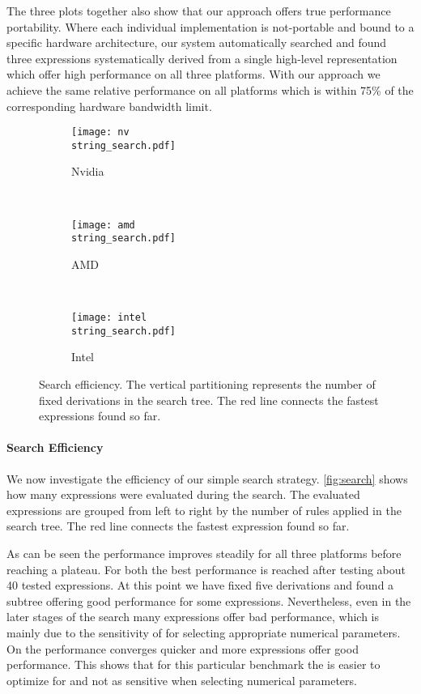 The three plots together also show that our approach offers true performance portability.
Where each individual \BLAS implementation is not-portable and bound to a specific hardware architecture, our system automatically searched and found three expressions systematically derived from a single high-level representation which offer high performance on all three platforms.
With our approach we achieve the same relative performance on all platforms which is within 75\% of the corresponding hardware bandwidth limit.

\begin{figure*}[p]
%
\centering
\begin{subfigure}[b]{0.65\linewidth}
\texttt{[image: nv\\string\_search.pdf]}
\caption{Nvidia \GPU}
\label{fig:search:nv}
\end{subfigure}
\\
%
\begin{subfigure}[b]{0.65\linewidth}
\texttt{[image: amd\\string\_search.pdf]}
\caption{AMD \GPU}
\label{fig:search:amd}
\end{subfigure}
\\
%
\begin{subfigure}[b]{0.65\linewidth}
\texttt{[image: intel\\string\_search.pdf]}
\caption{Intel \CPU}
\label{fig:search:intel}
\end{subfigure}

\caption[Search efficiency of our prototype search tool]{
   Search efficiency.
   The vertical partitioning represents the number of fixed derivations in the search tree.
   The red line connects the fastest expressions found so far.
}
\label{fig:search}
\end{figure*}


\paragraph{Search Efficiency}
We now investigate the efficiency of our simple search strategy.
\autoref{fig:search} shows how many expressions were evaluated during the search.
The evaluated expressions are grouped from left to right by the number of rules applied in the search tree.
The red line connects the fastest expression found so far.

As can be seen the performance improves steadily for all three platforms before reaching a plateau.
For both \GPUs the best performance is reached after testing about 40 tested expressions.
At this point we have fixed five derivations and found a subtree offering good performance for some expressions.
Nevertheless, even in the later stages of the search many expressions offer bad performance, which is mainly due to the sensitivity of \GPUs for selecting appropriate numerical parameters.
On the \CPU performance converges quicker and more expressions offer good performance.
This shows that for this particular benchmark the \CPU is easier to optimize for and not as sensitive when selecting numerical parameters.

